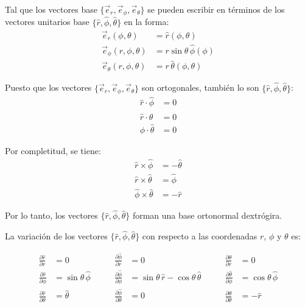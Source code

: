 \documentclass[../apunte_mecanica_clasica.tex]{subfiles}%
\begin{document}
Tal que los vectores base $\{\vec{e}_r, \vec{e}_\phi, \vec{e}_\theta\}$ se pueden escribir en términos de los vectores unitarios base $\{\hat{r}, \hat{\phi}, \hat{\theta}\}$ en la forma:
\begin{equation*}
\begin{aligned}
    \vec{e}_r(\phi, \theta) &= \hat{r}(\phi, \theta) \\
    \vec{e}_\phi(r, \phi, \theta) &= r \sin\theta\, \hat{\phi}(\phi) \\
    \vec{e}_\theta(r, \phi, \theta) &= r\, \hat{\theta}(\phi, \theta)
\end{aligned}
\end{equation*}

Puesto que los vectores $\{\vec{e}_r, \vec{e}_\phi, \vec{e}_\theta\}$ son ortogonales, también lo son $\{\hat{r}, \hat{\phi}, \hat{\theta}\}$:
\begin{equation*}
\begin{aligned}
    \hat{r} \cdot \hat{\phi} &= 0 \\
    \hat{r} \cdot \hat{\theta} &= 0 \\
    \hat{\phi} \cdot \hat{\theta} &= 0
\end{aligned}
\end{equation*}

Por completitud, se tiene:
\begin{equation*}
\begin{aligned}
    \hat{r} \times \hat{\phi} &= -\hat{\theta} \\
    \hat{r} \times \hat{\theta} &= \hat{\phi} \\
    \hat{\phi} \times \hat{\theta} &= -\hat{r}
\end{aligned}
\end{equation*}

Por lo tanto, los vectores $\{\hat{r}, \hat{\phi}, \hat{\theta}\}$ forman una base ortonormal dextrógira.

La variación de los vectores $\{\hat{r}, \hat{\phi}, \hat{\theta}\}$ con respecto a las coordenadas $r$, $\phi$ y $\theta$ es:

\begin{equation*}
\begin{aligned}
    \frac{\partial \hat{r}}{\partial r} &= 0 &\qquad \frac{\partial \hat{\phi}}{\partial r} &= 0 &\qquad \frac{\partial \hat{\theta}}{\partial r} &= 0 \\
    \frac{\partial \hat{r}}{\partial \phi} &= \sin\theta \, \hat{\phi} &\qquad \frac{\partial \hat{\phi}}{\partial \phi} &= \sin\theta \, \hat{r} - \cos\theta \, \hat{\theta} &\qquad \frac{\partial \hat{\theta}}{\partial \phi} &= \cos\theta \, \hat{\phi} \\
    \frac{\partial \hat{r}}{\partial \theta} &= \hat{\theta} &\qquad \frac{\partial \hat{\phi}}{\partial \theta} &= 0 &\qquad \frac{\partial \hat{\theta}}{\partial \theta} &= -\hat{r}
\end{aligned}
\end{equation*}
\end{document}
